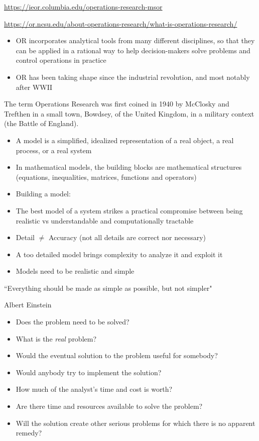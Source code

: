 \url{https://ieor.columbia.edu/operations-research-msor}

\url{https://or.ncsu.edu/about-operations-research/what-is-operations-research/}


\begin{itemize}
  \item OR incorporates analytical tools from many different disciplines, so that they can be applied in a rational way to help decision-makers solve problems and control operations in practice
  \item OR has been taking shape since the industrial revolution, and most notably after WWII
\end{itemize}
The term Operations Research was first coined in 1940 by McClosky and Trefthen
in a small town, Bowdsey, of the United Kingdom, in a military context (the Battle of England).



  \begin{itemize}
    \item A model is a simplified, idealized representation of a real object, a real process, or a real system
    \item In mathematical models, the building blocks are mathematical structures (equations, inequalities, matrices, functions and operators)
    \item Building a model:
          
  \end{itemize}



  \begin{itemize}
    \item The best model of a system strikes a practical compromise between being realistic vs understandable and computationally tractable
    \item Detail $\neq$ Accuracy (not all details are correct nor necessary)
    \item A too detailed model brings complexity to analyze it and exploit it
    \item Models need to be realistic and simple
  \end{itemize}
  \epigraph{``Everything should be made as simple as possible, but not simpler"}{Albert Einstein}




  \begin{itemize}
    \item Does the problem need to be solved?
    \item What is the {\it real} problem?
    \item Would the eventual solution to the problem useful for somebody?
    \item Would anybody try to implement the solution?
    \item How much of the analyst's time and cost is worth?
    \item Are there time and resources available to solve the problem?
    \item Will the solution create other serious problems for which there is no apparent remedy?
  \end{itemize}


